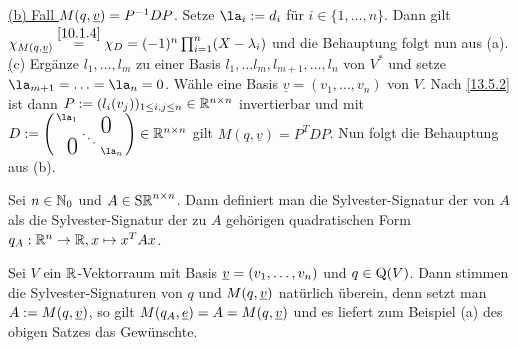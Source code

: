 \documentclass[../../main.tex]{subfiles}
\begin{document}
\begin{cproof}
\noindent\underline{(b) Fall $M(q,{\underline v})=P^{-1}DP$}. Setze $\la_i:= d_i$ für $i\in\{1,\ldots ,n\}$. Dann gilt $\chi_{M(q,{\underline v})}\stackrel{\ref{10.1.4}}{=}\chi_D=(-1)^n\prod_{i=1}^n(X-\lambda_i)$ und die Behauptung folgt nun aus (a).\\
		
\noindent\underline(c) Ergänze $l_1,\ldots ,l_m$ zu einer Basis $l_1,\ldots l_m,l_{m+1},\ldots ,l_n$ von $V^*$ und setze $\la_{m+1}=\ldots =\la_n=0$. Wähle eine Basis $\underline{v}=(v_1,\ldots ,v_n)$ von $V$. Nach \ref{13.5.2} ist dann $P:=(l_i(v_j))_{1\le i,j\le n}\in \mathbb R^{n\times n}$ invertierbar und mit $D:=\left(\begin{smallmatrix}
\la_1 & & \llap{$\overset{\blap{\LARGE 0}}{~}$} \\
& \ddots &\\
\rlap{\tlap{\LARGE 0}} & & \la_n\end{smallmatrix}\right)\in \R^{n\times n}$ gilt $M(q,\underline{v})=P^TDP$. Nun folgt die Behauptung aus (b). 
\end{cproof}

\begin{df}\label{14.1.3}
Sei $n\in \mathbb N_0$ und $A\in \operatorname{S\mathbb R}^{n\times n}$. Dann definiert man die Sylvester-Signatur der von $A$ als die Sylvester-Signatur der zu $A$ gehörigen quadratischen Form $q_A: \mathbb R^n\to \mathbb R, x\mapsto x^TAx$.
\end{df}
	
\begin{bem}\label{14.1.4}
Sei $V$ ein $\mathbb R$-Vektorraum mit Basis ${\underline v}=(v_1,\ldots ,v_n)$ und $q\in\operatorname{Q}(V)$. Dann stimmen die Sylvester-Signaturen von $q$ und $M(q,{\underline v})$ natürlich überein, denn setzt man $A:=M(q,{\underline v})$, so gilt $M(q_A,{\underline e})=A=M(q,{\underline v} )$ und es liefert zum Beispiel (a) des obigen Satzes das Gewünschte.
\end{bem}
\end{document}
